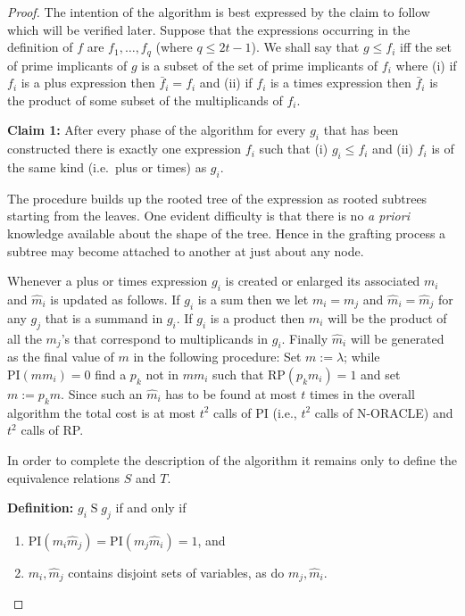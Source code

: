 \begin{proof}
The intention of the algorithm is best expressed by the claim to follow which will be verified later. Suppose that the expressions occurring in the definition of $f$ are $f_1, \ldots, f_q$ (where $q \leq 2t{-}1$). We shall say that $g \leq f_i$ iff the set of prime implicants of $g$ is a subset of the set of prime implicants of $f_i$ where (i) if $f_i$ is a plus expression then $\bar{f}_i = f_i$ and (ii) if $f_i$ is a times expression then $\bar{f}_i$ is the product of some subset of the multiplicands of $f_i$.

\textbf{Claim 1:} After every phase of the algorithm for every $g_i$ that has been constructed there is exactly one expression $f_i$ such that (i) $g_i \leq f_i$ and (ii) $f_i$ is of the same kind (i.e.\ plus or times) as $g_i$.

The procedure builds up the rooted tree of the expression as rooted subtrees starting from the leaves. One evident difficulty is that there is no \emph{a priori} knowledge available about the shape of the tree. Hence in the grafting process a subtree may become attached to another at just about any node.

Whenever a plus or times expression $g_i$ is created or enlarged its associated $m_i$ and $\hat{m}_i$ is updated as follows. If $g_i$ is a sum then we let $m_i = m_j$ and $\hat{m}_i = \hat{m}_j$ for any $g_j$ that is a summand in $g_i$. If $g_i$ is a product then $m_i$ will be the product of all the $m_j$'s that correspond to multiplicands in $g_i$. Finally $\hat{m}_i$ will be generated as the final value of $m$ in the following procedure: Set $m := \lambda$; while $\text{PI}(mm_i) = 0$ find a $p_k$ not in $mm_i$ such that $\text{RP}(p_k m_i) = 1$ and set $m := p_k m$. Since such an $\hat{m}_i$ has to be found at most $t$ times in the overall algorithm the total cost is at most $t^2$ calls of PI (i.e., $t^2$ calls of N-ORACLE) and $t^2$ calls of RP.

In order to complete the description of the algorithm it remains only to define the equivalence relations $S$ and $T$.

\textbf{Definition:} $g_i \mathrel{S} g_j$ if and only if
\begin{enumerate}
    \item[(i)] $\text{PI}(m_i \hat{m}_j) = \text{PI}(m_j \hat{m}_i) = 1$, and
    \item[(ii)] $m_i, \hat{m}_j$ contains disjoint sets of variables, as do $m_j, \hat{m}_i$.
\end{enumerate}


\end{proof}
